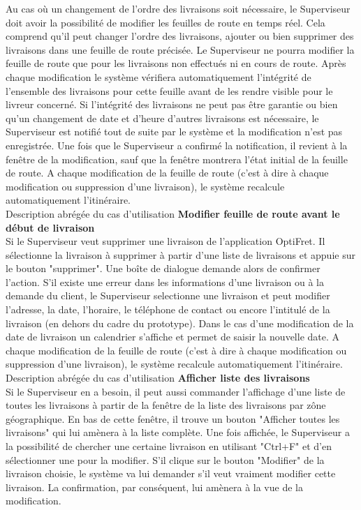 \documentclass[a4paper, 10pt]{article}
\begin{document}
Au cas où un changement de l'ordre des livraisons soit nécessaire, le
Superviseur doit avoir la possibilité de modifier les feuilles de route en
temps réel. Cela comprend qu'il peut changer l'ordre des livraisons, ajouter ou
bien supprimer des livraisons dans une feuille de route précisée. Le
Superviseur ne pourra modifier la feuille de route que pour les livraisons non
effectués ni en cours de route. Après chaque modification le système vérifiera
automatiquement l'intégrité de l'ensemble des livraisons pour cette feuille
avant de les rendre visible pour le livreur concerné.
Si l'intégrité des livraisons ne peut pas être garantie ou bien qu'un
changement de date et d'heure d'autres livraisons est nécessaire, le
Superviseur est notifié tout de suite par le système et la modification n'est
pas enregistrée. Une fois que le Superviseur a confirmé la notification, il
revient à la fenêtre de la modification, sauf que la fenêtre montrera l'état
initial de la feuille de route.
A chaque modification de la feuille de route (c'est à dire à chaque
modification ou suppression d'une livraison), le système recalcule
automatiquement l'itinéraire. \\

Description abrégée du cas d'utilisation
\textbf{Modifier feuille de route avant le début de livraison} \\

Si le Superviseur veut supprimer une livraison de l'application OptiFret. Il
sélectionne la livraison à supprimer à partir d'une liste de livraisons et
appuie sur le bouton "supprimer". Une boîte de dialogue demande alors de
confirmer l'action.
S'il existe une erreur dans les informations d'une livraison ou à la demande du
client, le Superviseur selectionne une livraison et peut modifier l'adresse, la
date, l'horaire, le téléphone de contact ou encore l'intitulé de la livraison
(en dehors du cadre du prototype). Dans le cas d'une modification de la date de
livraison un calendrier s'affiche et permet de saisir la nouvelle date.
A chaque modification de la feuille de route (c'est à dire à chaque
modification ou suppression d'une livraison), le système recalcule
automatiquement l'itinéraire. \\

Description abrégée du cas d'utilisation
\textbf{Afficher liste des livraisons} \\

Si le Superviseur en a besoin, il peut aussi commander l'affichage d'une liste
de toutes les livraisons à partir de la fenêtre de la liste des livraisons par
zône géographique. En bas de cette fenêtre, il trouve un bouton "Afficher
toutes les livraisons" qui lui amènera à la liste complète. Une fois affichée,
le Superviseur a la possibilité de chercher une certaine livraison en utilisant
"Ctrl+F" et d'en sélectionner une pour la modifier. S'il clique sur le bouton
"Modifier" de la livraison choisie, le système va lui demander s'il veut
vraiment modifier cette livraison. La confirmation, par conséquent, lui amènera
à la vue de la modification. \\
\end{document}
